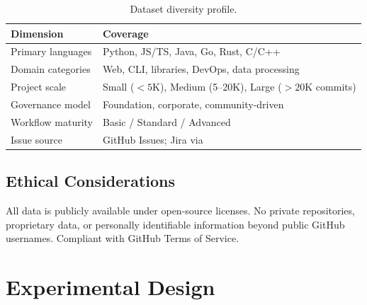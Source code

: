 \begin{table}[htbp]
\centering
\caption{Dataset diversity profile.}
\label{tab:dataset-diversity}
\begin{tabular}{ll}
\toprule
\textbf{Dimension} & \textbf{Coverage} \\
\midrule
Primary languages   & Python, JS/TS, Java, Go, Rust, C/C++ \\
Domain categories   & Web, CLI, libraries, DevOps, data processing \\
Project scale       & Small ($<5$K), Medium (5--20K), Large ($>20$K commits) \\
Governance model    & Foundation, corporate, community-driven \\
Workflow maturity   & Basic / Standard / Advanced \\
Issue source        & GitHub Issues; Jira via~\cite{montgomery2022jira} \\
\bottomrule
\end{tabular}
\end{table}


\subsection{Ethical Considerations}
\label{sec:ethics}

All data is publicly available under open-source licenses. No private
repositories, proprietary data, or personally identifiable information
beyond public GitHub usernames. Compliant with GitHub Terms of Service.


\section{Experimental Design}
\label{sec:eval-design}

